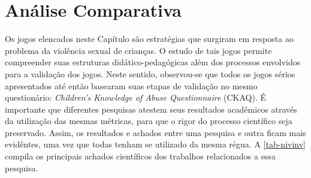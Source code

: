 











\section{Análise Comparativa}\label{sssec:finais}

Os jogos elencados neste Capítulo são estratégias que surgiram em resposta ao problema da violência sexual de crianças. O estudo de tais jogos permite compreender suas estruturas didático-pedagógicas além dos processos envolvidos para a validação dos jogos. Neste sentido, observou-se que todos os jogos sérios apresentados até então basearam suas etapas de validação no mesmo questionário: \textit{Children’s Knowledge of Abuse Questionnaire} (CKAQ). É importante que diferentes pesquisas atestem seus resultados acadêmicos através da utilização das mesmas métricas, para que o rigor do processo científico seja preservado. Assim, os resultados e achados entre uma pesquisa e outra ficam mais evidêntes, uma vez que todas tenham se utilizado da mesma régua. A \autoref{tab-nivinv} compila os principais achados científicos dos trabalhos relacionados a essa pesquisa.



